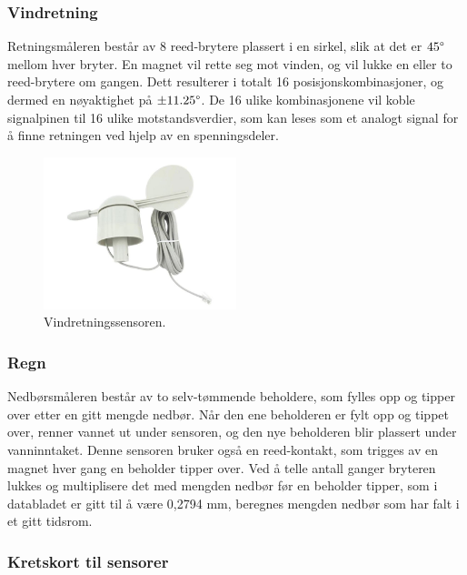 
\subsubsection{Vindretning}

Retningsmåleren består av 8 reed-brytere plassert i en sirkel, slik at det er $45\degree$ mellom hver bryter. En magnet vil rette seg mot vinden, og vil lukke en eller to reed-brytere om gangen. Dett resulterer i totalt 16 posisjonskombinasjoner, og dermed en nøyaktighet på $\pm 11.25\degree$. De 16 ulike kombinasjonene vil koble signalpinen til 16 ulike motstandsverdier, som kan leses som et analogt signal for å finne retningen ved hjelp av en spenningsdeler.


\begin{figure}[H]
    \centering
    \includegraphics[width=0.5\textwidth]{implementering/vindretning.png}
    \caption{Vindretningssensoren.}
    \label{fig:vindretning}
\end{figure}


\subsubsection{Regn}

Nedbørsmåleren består av to selv-tømmende beholdere, som fylles opp og tipper over etter en gitt mengde nedbør. Når den ene beholderen er fylt opp og tippet over, renner vannet ut under sensoren, og den nye beholderen blir plassert under vanninntaket. Denne sensoren bruker også en reed-kontakt, som trigges av en magnet hver gang en beholder tipper over. Ved å telle antall ganger bryteren lukkes og multiplisere det med mengden nedbør før en beholder tipper, som i databladet er gitt til å være 0,2794 mm, beregnes mengden nedbør som har falt i et gitt tidsrom.

\subsubsection{Kretskort til sensorer}

